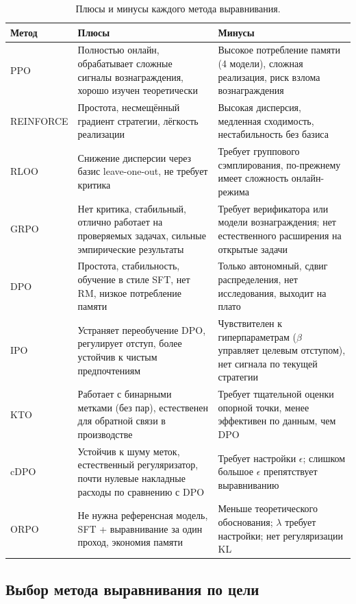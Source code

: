 \begin{table}[ht]
\centering
\caption{Плюсы и минусы каждого метода выравнивания.}
\label{tab:alignment-pros-cons}
\footnotesize
\begin{tabular}{@{}lp{3.5cm}p{3.5cm}@{}}
\toprule
\textbf{Метод} & \textbf{Плюсы} & \textbf{Минусы} \\
\midrule
PPO
  & Полностью онлайн, обрабатывает сложные сигналы вознаграждения, хорошо изучен теоретически
  & Высокое потребление памяти (4 модели), сложная реализация, риск взлома вознаграждения \\
\midrule
REINFORCE
  & Простота, несмещённый градиент стратегии, лёгкость реализации
  & Высокая дисперсия, медленная сходимость, нестабильность без базиса \\
\midrule
RLOO
  & Снижение дисперсии через базис leave-one-out, не требует критика
  & Требует группового сэмплирования, по-прежнему имеет сложность онлайн-режима \\
\midrule
GRPO
  & Нет критика, стабильный, отлично работает на проверяемых задачах, сильные эмпирические результаты
  & Требует верификатора или модели вознаграждения; нет естественного расширения на открытые задачи \\
\midrule
DPO
  & Простота, стабильность, обучение в стиле SFT, нет RM, низкое потребление памяти
  & Только автономный, сдвиг распределения, нет исследования, выходит на плато \\
\midrule
IPO
  & Устраняет переобучение DPO, регулирует отступ, более устойчив к чистым предпочтениям
  & Чувствителен к гиперпараметрам ($\beta$ управляет целевым отступом), нет сигнала по текущей стратегии \\
\midrule
KTO
  & Работает с бинарными метками (без пар), естественен для обратной связи в производстве
  & Требует тщательной оценки опорной точки, менее эффективен по данным, чем DPO \\
\midrule
cDPO
  & Устойчив к шуму меток, естественный регуляризатор, почти нулевые накладные расходы по сравнению с DPO
  & Требует настройки $\epsilon$; слишком большое $\epsilon$ препятствует выравниванию \\
\midrule
ORPO
  & Не нужна референсная модель, SFT + выравнивание за один проход, экономия памяти
  & Меньше теоретического обоснования; $\lambda$ требует настройки; нет регуляризации KL \\
\bottomrule
\end{tabular}
\end{table}

\subsection{Выбор метода выравнивания по цели}

